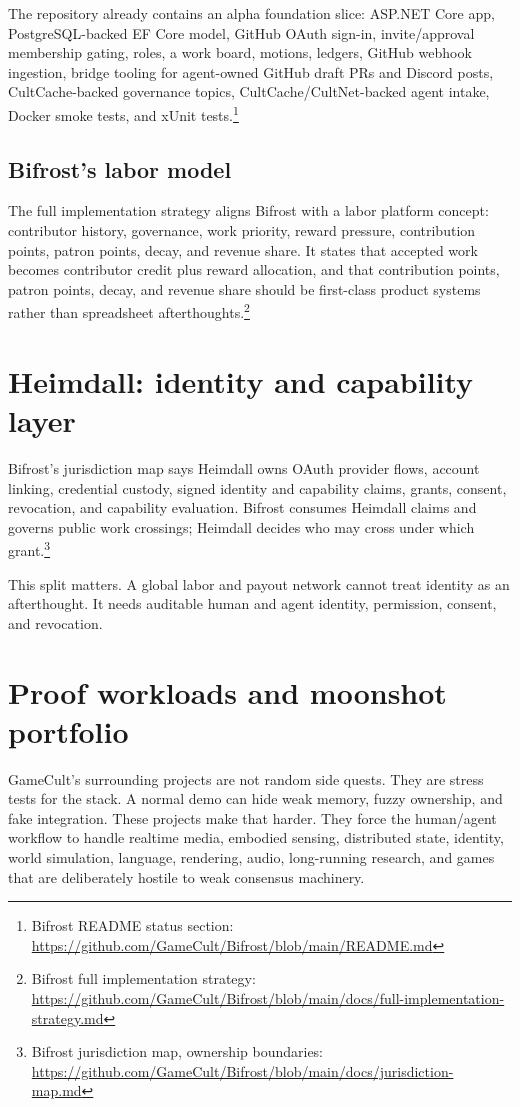 \documentclass[11pt,oneside]{report}
\newcommand{\src}[2]{\footnote{#1: \url{#2}}}
\begin{document}
The repository already contains an alpha foundation slice: ASP.NET Core app, PostgreSQL-backed EF Core model, GitHub OAuth sign-in, invite/approval membership gating, roles, a work board, motions, ledgers, GitHub webhook ingestion, bridge tooling for agent-owned GitHub draft PRs and Discord posts, CultCache-backed governance topics, CultCache/CultNet-backed agent intake, Docker smoke tests, and xUnit tests.\src{Bifrost README status section}{https://github.com/GameCult/Bifrost/blob/main/README.md}

\subsection{Bifrost's labor model}

The full implementation strategy aligns Bifrost with a labor platform concept: contributor history, governance, work priority, reward pressure, contribution points, patron points, decay, and revenue share. It states that accepted work becomes contributor credit plus reward allocation, and that contribution points, patron points, decay, and revenue share should be first-class product systems rather than spreadsheet afterthoughts.\src{Bifrost full implementation strategy}{https://github.com/GameCult/Bifrost/blob/main/docs/full-implementation-strategy.md}

\section{Heimdall: identity and capability layer}

Bifrost's jurisdiction map says Heimdall owns OAuth provider flows, account linking, credential custody, signed identity and capability claims, grants, consent, revocation, and capability evaluation. Bifrost consumes Heimdall claims and governs public work crossings; Heimdall decides who may cross under which grant.\src{Bifrost jurisdiction map, ownership boundaries}{https://github.com/GameCult/Bifrost/blob/main/docs/jurisdiction-map.md}

This split matters. A global labor and payout network cannot treat identity as an afterthought. It needs auditable human and agent identity, permission, consent, and revocation.

\section{Proof workloads and moonshot portfolio}

GameCult's surrounding projects are not random side quests. They are stress tests for the stack. A normal demo can hide weak memory, fuzzy ownership, and fake integration. These projects make that harder. They force the human/agent workflow to handle realtime media, embodied sensing, distributed state, identity, world simulation, language, rendering, audio, long-running research, and games that are deliberately hostile to weak consensus machinery.
\end{document}
